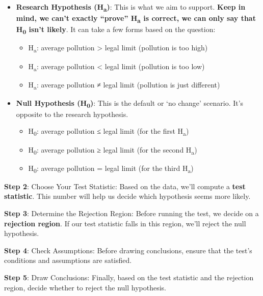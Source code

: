 \documentclass[
  letterpaper,
  DIV=11,
  numbers=noendperiod]{scrreprt}
\providecommand{\tightlist}{%
  \setlength{\itemsep}{0pt}\setlength{\parskip}{0pt}}\usepackage{longtable,booktabs,array}
\begin{document}
\begin{itemize}
\tightlist
\item
  \textbf{Research Hypothesis (H\textsubscript{a})}: This is what we aim
  to support. \textbf{Keep in mind, we can't exactly ``prove''
  H\textsubscript{a} is correct, we can only say that H\textsubscript{0}
  isn't likely}. It can take a few forms based on the question:

  \begin{itemize}
  \tightlist
  \item
    H\textsubscript{a}: average pollution \textgreater{} legal limit
    (pollution is too high)
  \item
    H\textsubscript{a}: average pollution \textless{} legal limit
    (pollution is too low)
  \item
    H\textsubscript{a}: average pollution ≠ legal limit (pollution is
    just different)
  \end{itemize}
\item
  \textbf{Null Hypothesis (H\textsubscript{0})}: This is the default or
  `no change' scenario. It's opposite to the research hypothesis.

  \begin{itemize}
  \tightlist
  \item
    H\textsubscript{0}: average pollution ≤ legal limit (for the first
    H\textsubscript{a})
  \item
    H\textsubscript{0}: average pollution ≥ legal limit (for the second
    H\textsubscript{a})
  \item
    H\textsubscript{0}: average pollution = legal limit (for the third
    H\textsubscript{a})
  \end{itemize}
\end{itemize}

\textbf{Step 2}: Choose Your Test Statistic: Based on the data, we'll
compute a \textbf{test statistic}. This number will help us decide which
hypothesis seems more likely.

\textbf{Step 3}: Determine the Rejection Region: Before running the
test, we decide on a \textbf{rejection region}. If our test statistic
falls in this region, we'll reject the null hypothesis.

\textbf{Step 4}: Check Assumptions: Before drawing conclusions, ensure
that the test's conditions and assumptions are satisfied.

\textbf{Step 5}: Draw Conclusions: Finally, based on the test statistic
and the rejection region, decide whether to reject the null hypothesis.
\end{document}
